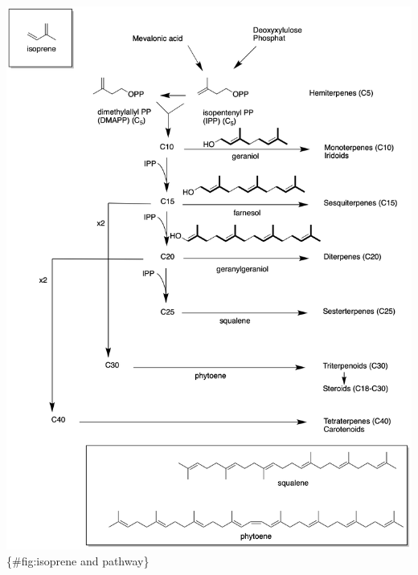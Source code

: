 \documentclass[
  letterpaper,
  DIV=11,
  numbers=noendperiod]{scrartcl}
\begin{document}
\includegraphics{../graphics/isoprene and pathway.png}\{\#fig:isoprene
and pathway\}
\end{document}

